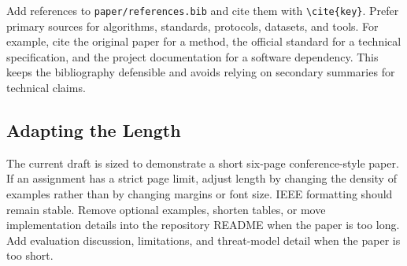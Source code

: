 Add references to \texttt{paper/references.bib} and cite them with \texttt{\textbackslash cite\{key\}}. Prefer primary sources for algorithms, standards, protocols, datasets, and tools. For example, cite the original paper for a method, the official standard for a technical specification, and the project documentation for a software dependency. This keeps the bibliography defensible and avoids relying on secondary summaries for technical claims.

\subsection{Adapting the Length}

The current draft is sized to demonstrate a short six-page conference-style paper. If an assignment has a strict page limit, adjust length by changing the density of examples rather than by changing margins or font size. IEEE formatting should remain stable. Remove optional examples, shorten tables, or move implementation details into the repository README when the paper is too long. Add evaluation discussion, limitations, and threat-model detail when the paper is too short.
